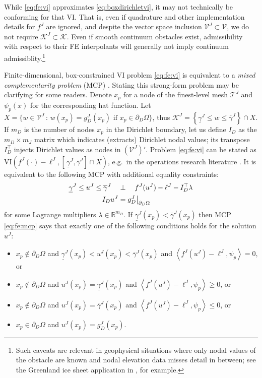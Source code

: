 \documentclass[letterpaper,final,12pt,reqno]{amsart}
\theoremstyle{cstyle}
\theoremstyle{cstyle*}
\theoremstyle{dstyle}
\numberwithin{equation}{section}
\numberwithin{figure}{section}
\numberwithin{table}{section}
\numberwithin{theorem}{section}
\newcommand{\RR}{\mathbb{R}}
\newcommand{\cK}{\mathcal{K}}
\newcommand{\cV}{\mathcal{V}}
\newcommand{\ip}[2]{\left<#1,#2\right>}
\begin{document}
While \eqref{eq:fe:vi} approximates \eqref{eq:boxdirichletvi}, it may not technically be conforming for that VI.  That is, even if quadrature and other implementation details for $f^J$ are ignored, and despite the vector space inclusion $\mathcal{V}^J \subset \mathcal{V}$, we do not require $\mathcal{K}^J \subset \mathcal{K}$.  Even if smooth continuum obstacles exist, admissibility with respect to their FE interpolants will generally not imply continuum admissiblity.\footnote{Such caveats are relevant in geophysical situations where only nodal values of the obstacle are known and nodal elevation data misses detail in between; see the Greenland ice sheet application in \cite{Bueler2016}, for example.}

Finite-dimensional, box-constrained VI problem \eqref{eq:fe:vi} is equivalent to a \emph{mixed complementarity problem} (MCP) \cite{FacchineiPang2003,FerrisPang1997}.  Stating this strong-form problem may be clarifying for some readers.  Denote $x_p$ for a node of the finest-level mesh $\mathcal{T}^J$ and $\psi_p(x)$ for the corresponding hat function.  Let $X=\big\{w\in\cV^J\,:\,w(x_p)=g_D^J(x_p) \text{ if } x_p\in \partial_D\Omega\big\}$, thus $\cK^J = \left\{\underline{\gamma}^J \le w \le \overline{\gamma}^J\right\} \cap X$.  If $m_D$ is the number of nodes $x_p$ in the Dirichlet boundary, let us define $I_D$ as the $m_D\times m_J$ matrix which indicates (extracts) Dirichlet nodal values; its transpose $I_D^\top$ injects Dirichlet values as nodes in $(\mathcal{V}^J)'$.  Problem \eqref{eq:fe:vi} can be stated as VI$\left(f^J(\cdot)-\ell^J,\left[\,\underline{\gamma}^J,\overline{\gamma}^J\right] \cap X\right)$, e.g.~in the operations research literature \cite{FerrisPang1997}.  It is equivalent to the following MCP with additional equality constraints:
\begin{align}
\underline{\gamma}^J \le u^J \le \overline{\gamma}^J \quad &\perp \quad f^J(u^J) - \ell^J - I_D^\top \lambda \label{eq:fe:mcp} \\
I_D u^J &= g_D^J\big|_{\partial_D\Omega} \notag
\end{align}
for some Lagrange multipliers $\lambda \in \RR^{m_D}$.  If $\underline{\gamma}^J(x_p) < \overline{\gamma}^J(x_p)$ then MCP \eqref{eq:fe:mcp} says that exactly one of the following conditions holds for the solution $u^J$:
\begin{itemize}
\item $x_p \notin \partial_D\Omega$ and $\underline{\gamma}^J(x_p)<u^J(x_p)<\overline{\gamma}^J(x_p)$ and $\ip{f^J(u^J)-\ell^J}{\psi_p} = 0$, or
\item $x_p \notin \partial_D\Omega$ and $u^J(x_p)=\underline{\gamma}^J(x_p)$ and $\ip{f^J(u^J)-\ell^J}{\psi_p} \ge 0$, or
\item $x_p \notin \partial_D\Omega$ and $u^J(x_p)=\overline{\gamma}^J(x_p)$ and $\ip{f^J(u^J)-\ell^J}{\psi_p} \le 0$, or
\item $x_p \in \partial_D\Omega$ and $u^J(x_p)=g_D^J(x_p)$.
\end{itemize}
\end{document}
